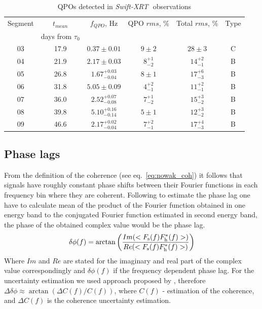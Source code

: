 \documentclass[a4paper,fleqn,usenatbib]{mnras}
\def\swiftx{{\em Swift-XRT\,}}
\begin{document}
\begin{table}
\noindent
\centering
\caption{QPOs detected in \swiftx\, observations}
\label{tab:xrtqpo}
\centering
\begin{tabular}{|c|c|c|c|c|c|}
\hline\hline
Segment &$t_{mean}$                   & $f_{QPO}$, Hz & QPO $rms$, \% & Total $rms$, \% & Type\\
                &   days from $\tau_{0}$     &                           &                           &                            &\\
\hline
03  &17.9&  $0.37\pm0.01$            & $9\pm2$       & $28\pm3$        & C\\
04  &21.9&  $2.17\pm0.03$            & $8_{-2}^{+1}$ & $14_{-1}^{+2}$  & B\\
05  &26.8&  $1.67_{-0.04}^{+0.03}$   & $8\pm1$       & $17_{-3}^{+6}$  & B\\ 
06  &31.8&  $5.05\pm0.09$            & $4_{-1}^{+2}$ & $11_{-1}^{+2}$  & B\\
07  &36.0&  $2.52_{-0.08}^{+0.07}$   & $7_{-2}^{+1}$ & $15_{-2}^{+3}$  & B\\ 
08  &39.8&  $5.10_{-0.14}^{+0.16}$   & $5\pm1$       & $12_{-2}^{+3}$  & B\\
09  &46.6&  $2.17_{-0.04}^{+0.02}$   & $7_{-1}^{+2}$ & $17_{-3}^{+4}$  & B\\
\hline
\end{tabular}
\end{table}

\subsection{Phase lags}
        From the definition of the coherence (see eq.~\ref{eq:nowak_coh}) it follows that signals have roughly constant phase shifts between their Fourier functions in each frequency bin where they are coherent. 
Following  to estimate the phase lag one have to calculate mean of the product of the Fourier function obtained in one energy band to the conjugated Fourier function estimated in second energy band, the phase of the obtained complex value would be the phase lag. 
\begin{equation}
      \delta \phi(f) = \arctan{\left(\frac{Im(<F_{\rm s}(f) F_{\rm h}^{*}(f)>)}{Re(<F_{\rm s}(f) F_{\rm h}^{*}(f)>)}\right)}
\end{equation}
Where $Im$ and $Re$ are stated for the imaginary and real part of the complex value correspondingly and $\delta \phi(f)$ if the frequency dependent phase lag. 
For the uncertainty estimation we used approach proposed by \citet{2014A&ARv..22...72U}, therefore $\Delta\delta\phi \approx \arctan{(\Delta C(f)/C(f))}$, where $C(f)$ - estimation of the coherence, and $\Delta C(f)$ is the coherence uncertainty estimation.
\end{document}
